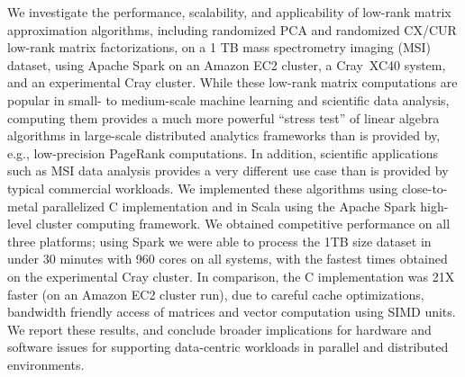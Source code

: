 We investigate the performance, scalability, and applicability of low-rank matrix approximation algorithms, including randomized PCA and randomized CX/CUR low-rank matrix factorizations, on a 1 TB mass spectrometry imaging (MSI) dataset, using Apache Spark on an Amazon EC2 cluster, a 
Cray~XC40 system, and an experimental Cray cluster.
While these low-rank matrix computations are popular in small- to medium-scale machine learning and scientific data analysis, computing them provides a much more powerful ``stress test'' of linear algebra algorithms in large-scale distributed analytics frameworks than is provided by, e.g., low-precision PageRank computations.
In addition, scientific applications such as MSI data analysis provides a very different use case 
than is provided by typical commercial workloads.
We implemented these algorithms using close-to-metal parallelized C 
implementation and in Scala using the Apache Spark high-level cluster computing framework.  
We obtained competitive performance on all three platforms; 
using Spark we were able to process the 1TB size dataset in under 30 minutes with 960 cores on all systems, with the fastest times obtained on the experimental Cray cluster.
In comparison, the C implementation was 21X faster (on an Amazon EC2 cluster run), due to careful cache optimizations,
bandwidth friendly access of matrices and vector computation using SIMD units. 
We report these results, and conclude broader implications for hardware and software issues for supporting data-centric workloads in parallel and distributed environments.  
